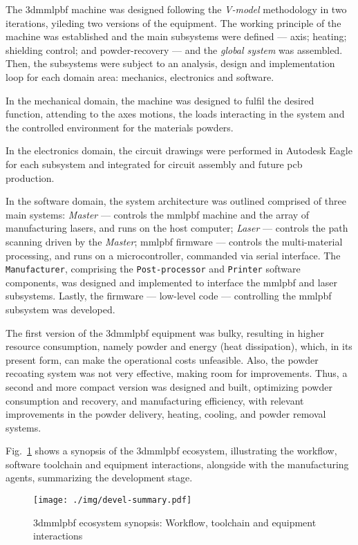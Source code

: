 The \gls{3dmmlpbf} machine was designed following the \emph{V-model} methodology in
two iterations, yileding two versions of the equipment. The working principle of the machine was established and the
main subsystems were defined --- axis; heating; shielding control; and
powder-recovery --- and the \emph{global system} was assembled.
Then, the subsystems were subject to an analysis, design and implementation
loop for each domain area: mechanics, electronics and software.

In the mechanical domain, the machine was designed to fulfil the desired
function, attending to the axes motions, the loads interacting in the system
and the controlled environment for the materials powders.

In the electronics domain, the circuit drawings were performed in Autodesk
Eagle for each subsystem and integrated for circuit assembly and future
\gls{pcb} production.

In the software domain, the system architecture was outlined comprised of
three main systems: \emph{Master} --- controls the \gls{mmlpbf} machine and the 
array of manufacturing lasers, and runs on the host computer; \emph{Laser} --- controls the path
scanning driven by the \emph{Master}; \gls{mmlpbf} firmware --- controls the
multi-material processing, and runs on a microcontroller, commanded via serial
interface. The \texttt{Manufacturer}, comprising the \texttt{Post-processor} and \texttt{Printer} software components, was designed and implemented to interface the \gls{mmlpbf}
and laser subsystems. Lastly, the firmware ---
low-level code --- controlling the \gls{mmlpbf} subsystem was developed.

The first version of the \gls{3dmmlpbf} equipment was bulky, resulting in
higher resource consumption, namely powder and energy (heat dissipation), which,
in its present form, can make the operational costs unfeasible. Also, the powder
recoating system was not very effective, making room for improvements.
Thus, a second and more compact version was designed and built, optimizing powder consumption and recovery, and manufacturing
efficiency, with relevant improvements in the powder delivery, heating, cooling,
and powder removal systems.

Fig.~\ref{fig:devel-summary} shows a synopsis of the \gls{3dmmlpbf} ecosystem,
illustrating the workflow, software toolchain and equipment interactions,
alongside with the manufacturing agents, summarizing the development stage.
%
\begin{figure}[!hbt]
  \centering
    \texttt{[image: ./img/devel-summary.pdf]}
  \caption{\gls{3dmmlpbf} ecosystem synopsis: Workflow, toolchain and
    equipment interactions}%
  \label{fig:devel-summary}
\end{figure}


